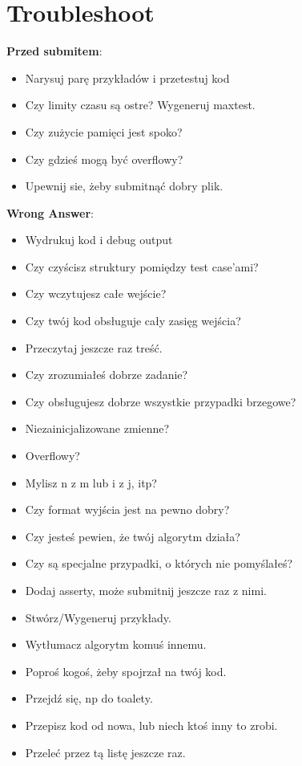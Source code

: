 \section{Troubleshoot}
\footnotesize{
\textbf{Przed submitem}:
\begin{itemize}[noitemsep]
	\item Narysuj parę przykładów i przetestuj kod
	\item Czy limity czasu są ostre? Wygeneruj maxtest.
	\item Czy zużycie pamięci jest spoko?
	\item Czy gdzieś mogą być overflowy? 
	\item Upewnij sie, żeby submitnąć dobry plik.
\end{itemize}

\textbf{Wrong Answer}:
\begin{itemize}[noitemsep]
	\item Wydrukuj kod i debug output
	\item Czy czyścisz struktury pomiędzy test case'ami?
	\item Czy wczytujesz całe wejście?
	\item Czy twój kod obsługuje cały zasięg wejścia?
	\item Przeczytaj jeszcze raz treść.
	\item Czy zrozumiałeś dobrze zadanie?
	\item Czy obsługujesz dobrze wszystkie przypadki brzegowe?
	\item Niezainicjalizowane zmienne?
	\item Overflowy?
	\item Mylisz n z m lub i z j, itp?
	\item Czy format wyjścia jest na pewno dobry?
	\item Czy jesteś pewien, że twój algorytm działa?
	\item Czy są specjalne przypadki, o których nie pomyślałeś?
	\item Dodaj asserty, może submitnij jeszcze raz z nimi.
	\item Stwórz/Wygeneruj przykłady.
	\item Wytłumacz algorytm komuś innemu.
	\item Poproś kogoś, żeby spojrzał na twój kod.
	\item Przejdź się, np do toalety.
	\item Przepisz kod od nowa, lub niech ktoś inny to zrobi.
	\item Przeleć przez tą listę jeszcze raz.
\end{itemize}

}
